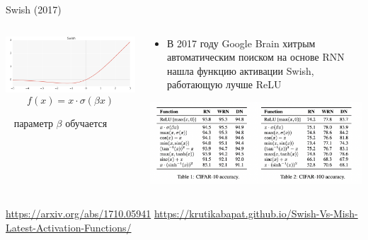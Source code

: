\documentclass[notes,12pt, aspectratio=169]{beamer}
\begin{document}
\begin{frame}{Swish (2017)}
	\begin{columns}
		\begin{column}{0.35\textwidth}
			\begin{center}
				\includegraphics[width=.95\linewidth]{swish.png}
				\[f(x) = x \cdot \sigma(\beta x) \]
			\end{center}
		\mbox{    } параметр $\beta$ обучается
		\end{column}
		\hfill
		\begin{column}{0.65\textwidth}
			\begin{itemize} 
				\item  В 2017 году Google Brain хитрым автоматическим поиском на основе RNN нашла функцию активации Swish, работающую лучше ReLU
			\end{itemize}
		\begin{center}
			\includegraphics[width=.99\linewidth]{swish_can.png}
		\end{center}
		\end{column}
	\end{columns}
\vfill %
\footnotesize
{\color{blue} \url{https://arxiv.org/abs/1710.05941} \newline \url{https://krutikabapat.github.io/Swish-Vs-Mish-Latest-Activation-Functions/} }
\end{frame}
\end{document}
